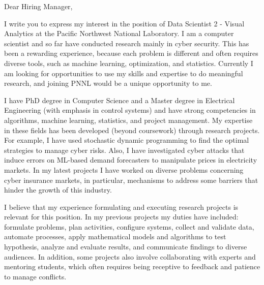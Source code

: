 \documentclass[letter,10pt]{letter}
\newcommand{\position}{Data Scientist 2 - Visual Analytics }
\newcommand{\place}{the Pacific Northwest National Laboratory}
\begin{document}
\begin{letter}{
}
 
\opening{Dear Hiring Manager,}

I write you to express my interest in the position of \position  at \place.
I am a computer scientist and so far have conducted research mainly in cyber security. This has been a rewarding experience, because each problem is different and often requires diverse tools, such as machine learning, optimization, and statistics. 
Currently I am looking for opportunities to use my skills and expertise to do meaningful research, and joining PNNL would be a unique opportunity to me.






I have PhD degree in Computer Science 
and a Master degree in Electrical Engineering (with emphasis in control systems) 
and have strong competencies in algorithms, machine learning, statistics, and project management. My expertise in these fields has been developed (beyond coursework) through research projects. 
For example, I have used stochastic dynamic programming to find the optimal strategies to manage cyber risks. 
Also, I have investigated cyber attacks that induce errors on ML-based demand forecasters to manipulate prices in electricity markets. 
In my latest projects I have worked on diverse problems concerning cyber insurance markets, in particular, mechanisms to address
some barriers that hinder the growth of this industry. 

I believe that my experience formulating and executing research projects is relevant for this position. In my previous projects my duties have included: formulate problems, plan activities, configure systems, collect and validate data, automate processes, apply mathematical models and algorithms to test hypothesis, analyze and evaluate results,  and communicate findings to diverse audiences. In addition, some projects also involve collaborating with experts and mentoring students, which often requires being receptive to feedback and patience to manage conflicts.



\end{letter}
\end{document}
